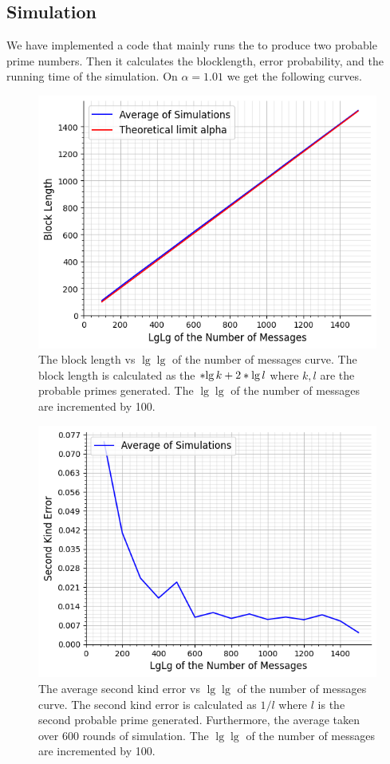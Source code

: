 \subsection{Simulation}
We have implemented a code that mainly runs the  to produce two probable prime numbers. Then it calculates the blocklength, error probability, and the running time of the simulation. On \(\alpha = 1.01\) we get the following curves.
\begin{figure}
	\includegraphics*[height = 0.4 \textheight]{graphic/msg50.png}
	\caption{The block length vs \(\lg \lg \) of the number of messages curve. The block length is calculated as the \(\ceil{\lg k} + 2 \ceil{\lg l}\) where \(k,l\) are the probable primes generated. The \(\lg \lg \) of the number of messages are incremented by 100.}
\end{figure}
\begin{figure}
	\includegraphics*[height = 0.4 \textheight]{graphic/errwo50.png}
	\caption{The average second kind error vs  \(\lg \lg \) of the number of messages curve. The second kind error is calculated as \(1/l\) where \(l\) is the second probable prime generated. Furthermore, the average taken over 600 rounds of simulation. The \(\lg \lg \) of the number of messages are incremented by 100.}
\end{figure}
